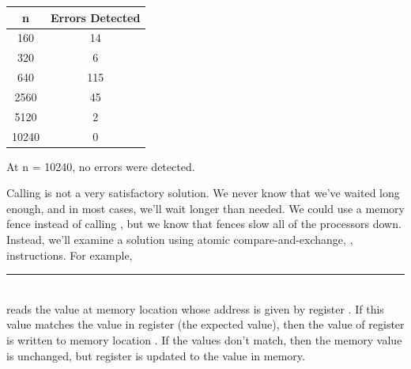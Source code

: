 \documentclass{article}
\newenvironment{answer}
{\color{blue}}
{\normalfont}
\begin{document}
\begin{enumerate}
\begin{enumerate}
\begin{answer}
                        \begin{center}
                            \begin{tabular}{|c|c|}
                                \hline
                                \textbf{n} & \textbf{Errors Detected} \\
                                \hline
                                160        & 14                       \\
                                \hline
                                320        & 6                        \\
                                \hline
                                640        & 115                      \\
                                \hline
                                2560       & 45                       \\
                                \hline
                                5120       & 2                        \\
                                \hline
                                10240      & 0                        \\
                                \hline
                            \end{tabular}
                        \end{center}

                        At n = 10240, no errors were detected.
                    \end{answer}
          \end{enumerate}

          Calling  is not a very satisfactory solution.  We never know that we've
          waited long enough, and in most cases, we'll wait longer than needed.  We could use a
          memory fence instead of calling , but we know that fences slow all of the
          processors down.  Instead, we'll examine a solution using atomic compare-and-exchange,
          , instructions.  For example,\\
          \rule{1.5em}{0ex}\\
          reads the value at memory location whose address is given by register .
          If this value matches the value in register  (the expected value),
          then the value of register  is written to memory location \code{[\%dst]}.
          If the values don't match, then the memory value is unchanged, but register 
          is updated to the value in memory.


\end{enumerate}
\end{document}
